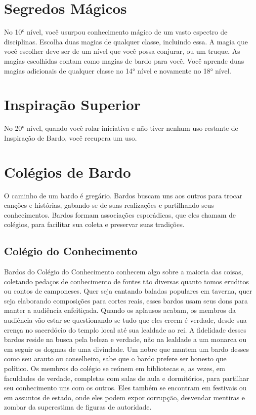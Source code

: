 \documentclass{RPG_Adventure}[2021/10/20]
\begin{document}
\section*{Segredos Mágicos}%
\label{sec:segredos_magicos}

No 10° nível, você usurpou conhecimento mágico de um vasto espectro de
disciplinas. Escolha duas magias de qualquer classe, incluindo essa. A magia que
você escolher deve ser de um nível que você possa conjurar, ou um truque.
As magias escolhidas contam como magias de bardo para você.
Você aprende duas magias adicionais de qualquer classe no 14° nível e novamente
no 18° nível.

\section*{Inspiração Superior}%
\label{sec:inspiracao_superior}

No 20° nível, quando você rolar iniciativa e não tiver nenhum uso restante de
Inspiração de Bardo, você recupera um uso.

\section*{Colégios de Bardo}%
\label{sec:colegios_de_bardo}

O caminho de um bardo é gregário. Bardos buscam uns aos outros para trocar
canções e histórias, gabando-se de suas realizações e partilhando seus
conhecimentos.
Bardos formam associações esporádicas, que eles chamam de colégios, para
facilitar sua coleta e preservar suas tradições.

\subsection{Colégio do Conhecimento}%
\label{sub:colegio_do_conhecimento}

Bardos do Colégio do Conhecimento conhecem algo sobre a maioria das coisas,
coletando pedaços de conhecimento de fontes tão diversas quanto tomos eruditos
ou contos de camponeses. Quer seja cantando baladas populares em taverna, quer
seja elaborando composições para cortes reais, esses bardos usam seus dons para
manter a audiência enfeitiçada. Quando os aplausos acabam, os membros da
audiência vão estar se questionando se tudo que eles creem é verdade, desde sua
crença no sacerdócio do templo local até sua lealdade ao rei.
A fidelidade desses bardos reside na busca pela beleza e verdade, não na
lealdade a um monarca ou em seguir os dogmas de uma divindade. Um nobre que
mantem um bardo desses como seu arauto ou conselheiro, sabe que o bardo prefere
ser honesto que político.
Os membros do colégio se reúnem em bibliotecas e, as vezes, em faculdades de
verdade, completas com salas de aula e dormitórios, para partilhar seu
conhecimento uns com os outros. Eles também se encontram em festivais ou em
assuntos de estado, onde eles podem expor corrupção, desvendar mentiras e zombar
da superestima de figuras de autoridade.
\end{document}
